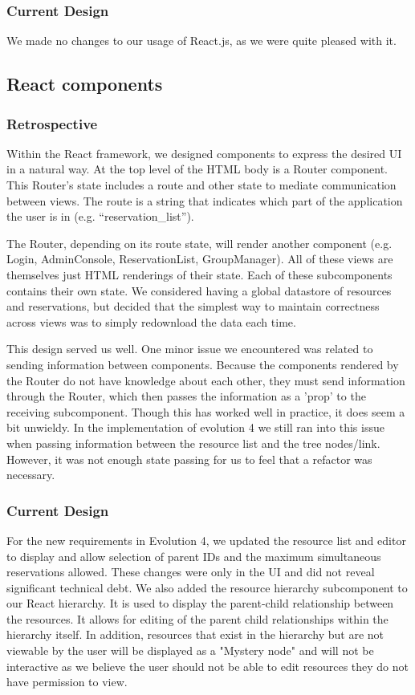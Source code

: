 \documentclass[12pt]{article}
\begin{document}
\subsubsection{Current Design}
We made no changes to our usage of React.js, as we were quite pleased with it.

\subsection{React components}
\subsubsection{Retrospective}
Within the React framework, we designed components to express the desired UI in a natural way. At the top level of the HTML body is a Router component. This Router's state includes a route and other state to mediate communication between views. The route is a string that indicates which part of the application the user is in (e.g. ``reservation\_list'').

The Router, depending on its route state, will render another component (e.g. Login, AdminConsole, ReservationList, GroupManager). All of these views are themselves just HTML renderings of their state. Each of these subcomponents contains their own state. We considered having a global datastore of resources and reservations, but decided that the simplest way to maintain correctness across views was to simply redownload the data each time.

This design served us well. One minor issue we encountered was related to sending information between components. Because the components rendered by the Router do not have knowledge about each other, they must send information through the Router, which then passes the information as a 'prop' to the receiving subcomponent. Though this has worked well in practice, it does seem a bit unwieldy. In the implementation of evolution 4 we still ran into this issue when passing information between the resource list and the tree nodes/link. However, it was not enough state passing for us to feel that a refactor was necessary.

\subsubsection{Current Design}
For the new requirements in Evolution 4, we updated the resource list and editor to display and allow selection of parent IDs and the maximum simultaneous reservations allowed. These changes were only in the UI and did not reveal significant technical debt. We also added the resource hierarchy subcomponent to our React hierarchy. It is used to display the parent-child relationship between the resources. It allows for editing of the parent child relationships within the hierarchy itself. In addition, resources that exist in the hierarchy but are not viewable by the user will be displayed as a "Mystery node" and will not be interactive as we believe the user should not be able to edit resources they do not have permission to view. 
\end{document}
